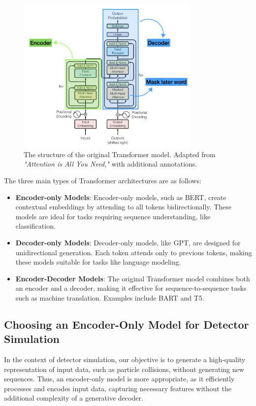 \begin{figure}[ht]
    \centering
    \includegraphics[width=0.8\textwidth]{Figures/transformerblock.png}
    \caption{The structure of the original Transformer model. Adapted from \textit{"Attention is All You Need,"} with additional annotations.}
    \label{fig:transformer_structure}
\end{figure}

The three main types of Transformer architectures are as follows:

\begin{itemize}
    \item \textbf{Encoder-only Models}: Encoder-only models, such as BERT, create contextual embeddings by attending to all tokens bidirectionally. These models are ideal for tasks requiring sequence understanding, like classification.
    
    \item \textbf{Decoder-only Models}: Decoder-only models, like GPT, are designed for unidirectional generation. Each token attends only to previous tokens, making these models suitable for tasks like language modeling.
    
    \item \textbf{Encoder-Decoder Models}: The original Transformer model combines both an encoder and a decoder, making it effective for sequence-to-sequence tasks such as machine translation. Examples include BART and T5.
\end{itemize}

\subsection{Choosing an Encoder-Only Model for Detector Simulation}
In the context of detector simulation, our objective is to generate a high-quality representation of input data, such as particle collisions, without generating new sequences. Thus, an encoder-only model is more appropriate, as it efficiently processes and encodes input data, capturing necessary features without the additional complexity of a generative decoder.


